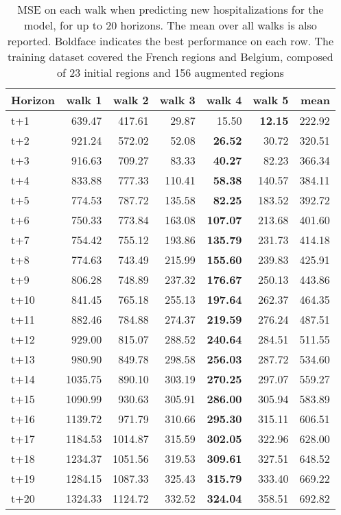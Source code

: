 \begin{table}[H]
\centering
\caption{MSE on each walk when predicting new hospitalizations for the model, for up to 20 horizons. The mean over all walks is also reported. Boldface indicates the best performance on each row. The training dataset covered the French regions and Belgium, composed of 23 initial regions and 156 augmented regions }
\label{tab:MSE_walk_encoder_decoder}
\begin{tabular}{lrrrrrr}
\toprule
Horizon &  walk 1 &  walk 2 &  walk 3 &  walk 4 &  walk 5 &   mean \\
\midrule
t+1  & 639.47  & 417.61  & 29.87  & 15.50  & \textbf{12.15}  & 222.92  \\
t+2  & 921.24  & 572.02  & 52.08  & \textbf{26.52}  & 30.72  & 320.51  \\
t+3  & 916.63  & 709.27  & 83.33  & \textbf{40.27}  & 82.23  & 366.34  \\
t+4  & 833.88  & 777.33  & 110.41  & \textbf{58.38}  & 140.57  & 384.11  \\
t+5  & 774.53  & 787.72  & 135.58  & \textbf{82.25}  & 183.52  & 392.72  \\
t+6  & 750.33  & 773.84  & 163.08  & \textbf{107.07}  & 213.68  & 401.60  \\
t+7  & 754.42  & 755.12  & 193.86  & \textbf{135.79}  & 231.73  & 414.18  \\
t+8  & 774.63  & 743.49  & 215.99  & \textbf{155.60}  & 239.83  & 425.91  \\
t+9  & 806.28  & 748.89  & 237.32  & \textbf{176.67}  & 250.13  & 443.86  \\
t+10  & 841.45  & 765.18  & 255.13  & \textbf{197.64}  & 262.37  & 464.35  \\
t+11  & 882.46  & 784.88  & 274.37  & \textbf{219.59}  & 276.24  & 487.51  \\
t+12  & 929.00  & 815.07  & 288.52  & \textbf{240.64}  & 284.51  & 511.55  \\
t+13  & 980.90  & 849.78  & 298.58  & \textbf{256.03}  & 287.72  & 534.60  \\
t+14  & 1035.75  & 890.10  & 303.19  & \textbf{270.25}  & 297.07  & 559.27  \\
t+15  & 1090.99  & 930.63  & 305.91  & \textbf{286.00}  & 305.94  & 583.89  \\
t+16  & 1139.72  & 971.79  & 310.66  & \textbf{295.30}  & 315.11  & 606.51  \\
t+17  & 1184.53  & 1014.87  & 315.59  & \textbf{302.05}  & 322.96  & 628.00  \\
t+18  & 1234.37  & 1051.56  & 319.53  & \textbf{309.61}  & 327.51  & 648.52  \\
t+19  & 1284.15  & 1087.33  & 325.43  & \textbf{315.79}  & 333.40  & 669.22  \\
t+20  & 1324.33  & 1124.72  & 332.52  & \textbf{324.04}  & 358.51  & 692.82  \\

\bottomrule
\end{tabular}
\end{table}
